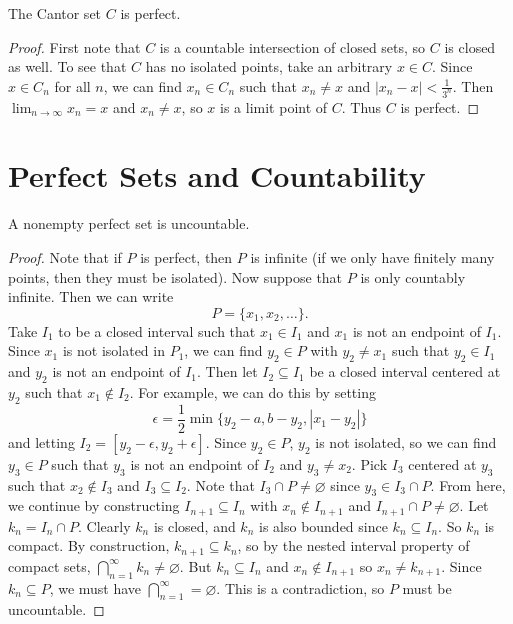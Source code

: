 \begin{theorem}
  The Cantor set $C$ is perfect.
\end{theorem}

\begin{proof}
  First note that $C$ is a countable intersection of
  closed sets, so $C$ is closed as well.
  To see that $C$ has no isolated points, take an arbitrary
  $x \in C$. Since $x \in C_n$ for all $n$, we can find
  $x_n \in C_n$ such that $x_n \ne x$ and
  $|x_n - x| < \frac{1}{3^n}$. Then $\lim_{n \to \infty} x_n = x$
  and $x_n \ne x$, so $x$ is a limit point of $C$.
  Thus $C$ is perfect.
\end{proof}

\section{Perfect Sets and Countability}

\begin{theorem}
  A nonempty perfect set is uncountable.
\end{theorem}

\begin{proof}
  Note that if $P$ is perfect, then $P$ is infinite
  (if we only have finitely many points, then they must be
  isolated). Now suppose that $P$ is only countably infinite.
  Then we can write
  \[P = \{x_1, x_2, \dots\}.\]
  Take $I_1$ to be a closed interval such that $x_1 \in I_1$
  and $x_1$ is not an endpoint of $I_1$.
  Since $x_1$ is not isolated in $P_1$, we can find $y_2 \in P$
  with $y_2 \ne x_1$
  such that $y_2 \in I_1$ and $y_2$ is not an endpoint of $I_1$.
  Then let $I_2 \subseteq I_1$ be a closed interval centered at
  $y_2$ such that $x_1 \notin I_2$. For example, we can do this
  by setting
  \[
    \epsilon = \frac{1}{2}\min\{y_2 - a, b - y_2, |x_1 - y_2|\}
  \]
  and letting $I_2 = [y_2 - \epsilon, y_2 + \epsilon]$.
  Since $y_2 \in P$, $y_2$ is not isolated, so we can find
  $y_3 \in P$ such that $y_3$ is not an endpoint of $I_2$ and
  $y_3 \ne x_2$. Pick $I_3$ centered at $y_3$ such that
  $x_2 \notin I_3$ and $I_3 \subseteq I_2$. Note that
  $I_3 \cap P \ne \varnothing$ since $y_3 \in I_3 \cap P$.
  From here, we continue by constructing
  $I_{n + 1} \subseteq I_n$ with $x_n \notin I_{n + 1}$ and
  $I_{n + 1} \cap P \ne \varnothing$. Let
  $k_n = I_n \cap P$. Clearly $k_n$ is closed, and $k_n$
  is also bounded since $k_n \subseteq I_n$. So $k_n$ is
  compact. By construction, $k_{n + 1} \subseteq k_n$, so
  by the nested interval property of compact sets,
  $\bigcap_{n = 1}^\infty k_n \ne \varnothing$. But
  $k_n \subseteq I_n$ and $x_n \notin I_{n + 1}$
  so $x_n \ne k_{n + 1}$. Since $k_n \subseteq P$, we must
  have $\bigcap_{n = 1}^\infty = \varnothing$. This is
  a contradiction, so $P$ must be uncountable.
\end{proof}
